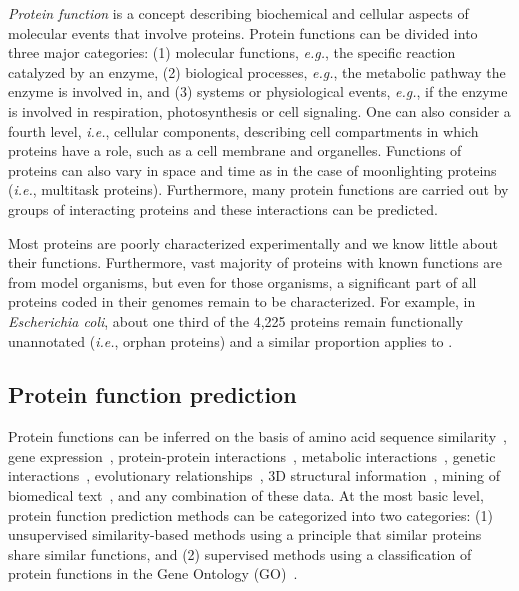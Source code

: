 \documentclass[5p]{elsarticle}
\newcommand{\eg}{\emph{e.g.}\xspace}
\newcommand{\ie}{\emph{i.e.}\xspace}
\newcommand{\rev}[1]{{\color{black}#1}}
\begin{document}
{\em Protein function} is a concept describing biochemical and cellular aspects of molecular events that involve proteins.
Protein functions can be divided into three major categories: (1) molecular functions, \eg, the specific reaction catalyzed by an enzyme, (2) biological processes, \eg, the metabolic pathway the enzyme is involved in, and (3) systems or physiological events, \eg, if the enzyme is involved in respiration, photosynthesis or cell signaling.
One can also consider a fourth level, \ie, cellular components, describing cell compartments in which proteins have a role, such as a cell membrane and organelles.
Functions of proteins can also vary in space and time as in the case of moonlighting proteins (\rev{\ie, multitask} proteins).
Furthermore, many protein functions are carried out by groups of interacting proteins and these interactions can be predicted.

Most proteins are poorly characterized experimentally and we know little about their functions.
Furthermore, vast majority of proteins with known functions are from model organisms, but even for those organisms, a significant part of all proteins coded in their genomes remain to be characterized.
For example, in {\em Escherichia coli}, about one third of the 4,225 proteins remain functionally unannotated (\ie, orphan proteins) and a similar proportion applies to \rev{{\em Saccharomyces cerevisiae}.}


\subsection{Protein function prediction}\label{sec:protein-function-prediction}

Protein functions can be inferred on the basis of amino acid sequence similarity~\cite{Zhang2017cofactor}, gene expression~\cite{Wan2017analysis}, protein-pro\-tein interactions~\cite{Mostafavi2008genemania,Amar2014constructing,Zhang2017cofactor}, meta\-bolic interactions~\cite{Manichaikul2009metabolic}, genetic interactions~\cite{Kuzmin2018systematic}, evolutionary relationships~\cite{Gaudet2011phylogenetic}, 3D structural information~\cite{Konc2014binding}, mining of \rev{biomedical text}~\cite{You2017deeptext2go}, and any combination of these data.
At the most basic level, protein function prediction methods can be categorized into two categories: (1) unsupervised similarity-based methods using a principle that similar proteins share similar functions, and (2) supervised methods using a classification of protein functions in the \rev{Gene Ontology (GO)}~\cite{Ashburner2000gene}.
\end{document}
